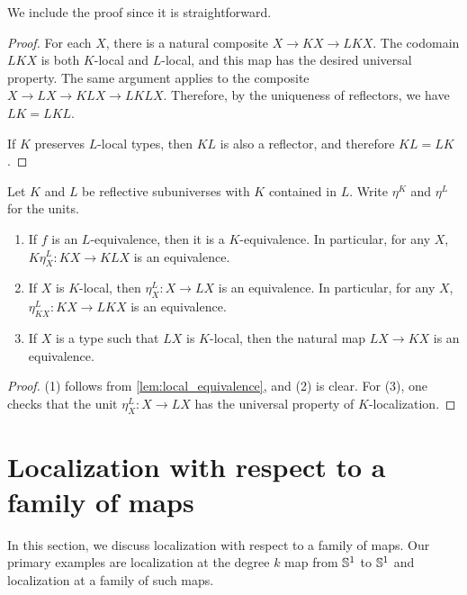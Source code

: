 We include the proof since it is straightforward.

\begin{proof}
  For each $X$, there is a natural composite $X \to KX \to LKX$.  The codomain
  $LKX$ is both $K$-local and $L$-local, and this map has the desired universal
  property.
  The same argument applies to the composite $X \to LX \to KLX \to LKLX$.
  Therefore, by the uniqueness of reflectors, we have $LK = LKL$.

  If $K$ preserves $L$-local types, then $KL$ is also a reflector, and therefore $KL=LK$.
\end{proof}

\begin{lem}\label{lemma:comparelocalization}
    Let $K$ and $L$ be reflective subuniverses with $K$ contained in $L$.
    Write $\eta^K$ and $\eta^L$ for the units.
    \begin{enumerate}
    \item If $f$ is an $L$-equivalence, then it is a $K$-equivalence.
          In particular, for any $X$, $K\eta^L_X : KX \to KLX$ is an equivalence.
    \item If $X$ is $K$-local, then $\eta^L_X : X \to LX$ is an equivalence.
          In particular, for any $X$, $\eta^L_{KX} : KX \to LKX$ is an equivalence.
    \item If $X$ is a type such that $LX$ is $K$-local, then the 
          natural map $LX \to KX$ is an equivalence.
    \end{enumerate}
\end{lem}

\begin{proof}
(1) follows from \cref{lem:local_equivalence}, and (2) is clear.
For (3), one checks that the unit $\eta^L_X : X \to LX$ has the universal
property of $K$-localization.
\end{proof}

\section{Localization with respect to a family of maps}\label{section:localization}

In this section, we discuss localization with respect to a family of maps.
Our primary examples are localization at the degree $k$ map from $\mathbb{S}^{1}$ to $\mathbb{S}^{1}$
and localization at a family of such maps.

